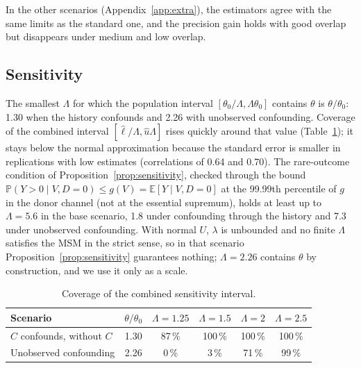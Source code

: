 \documentclass[11pt,a4paper]{article}
\newcommand{\E}{\mathbb{E}}
\newcommand{\PP}{\mathbb{P}}
\theoremstyle{plain}
\theoremstyle{definition}
\begin{document}
In the other scenarios (Appendix~\ref{app:extra}), the estimators agree with the same limits as the standard one, and the precision gain holds with good overlap but disappears under medium and low overlap.

\subsection{Sensitivity}\label{sec:res-sensitivity}

The smallest $\Lambda$ for which the population interval $[\theta_0/\Lambda,\Lambda\theta_0]$ contains $\theta$ is $\theta/\theta_0$: 1.30 when the history confounds and 2.26 with unobserved confounding. Coverage of the combined interval $[\hat\ell/\Lambda,\hat u\Lambda]$ rises quickly around that value (Table~\ref{tab:sensitivity}); it stays below the normal approximation because the standard error is smaller in replications with low estimates (correlations of 0.64 and 0.70). The rare-outcome condition of Proposition~\ref{prop:sensitivity}, checked through the bound $\PP(Y>0\mid V,D=0)\le g(V)=\E[Y\mid V,D=0]$ at the 99.99th percentile of $g$ in the donor channel (not at the essential supremum), holds at least up to $\Lambda=5.6$ in the base scenario, 1.8 under confounding through the history and 7.3 under unobserved confounding. With normal $U$, $\lambda$ is unbounded and no finite $\Lambda$ satisfies the MSM in the strict sense, so in that scenario Proposition~\ref{prop:sensitivity} guarantees nothing; $\Lambda=2.26$ contains $\theta$ by construction, and we use it only as a scale.

\begin{table}[ht]
\centering\small
\caption{Coverage of the combined sensitivity interval.}\label{tab:sensitivity}
\begin{tabular}{@{}lccccc@{}}
\toprule
Scenario & $\theta/\theta_0$ & $\Lambda=1.25$ & $\Lambda=1.5$ & $\Lambda=2$ & $\Lambda=2.5$ \\
\midrule
$C$ confounds, without $C$ & 1.30 & 87\,\% & 100\,\% & 100\,\% & 100\,\% \\
Unobserved confounding & 2.26 & 0\,\% & 3\,\% & 71\,\% & 99\,\% \\
\bottomrule
\end{tabular}
\end{table}
\end{document}
